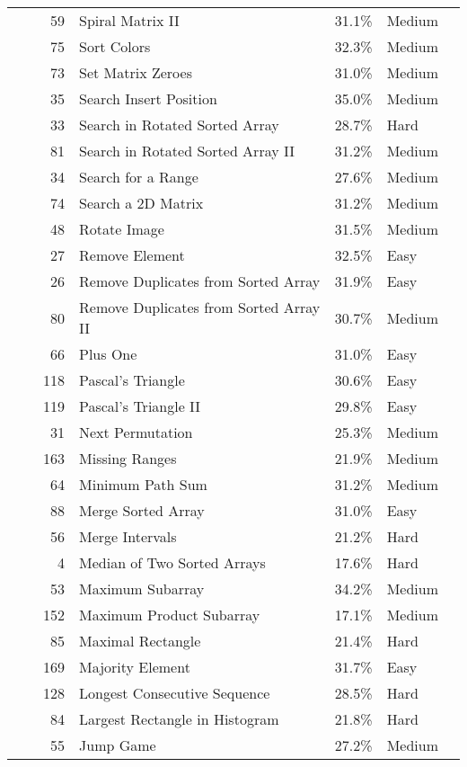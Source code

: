 \documentclass[9pt,b5paper]{article}
\begin{document}
\begin{center}
\begin{tabular}{lrrllll}
 &  & 59 & Spiral Matrix II & 31.1\% & Medium & \\
 &  & 75 & Sort Colors & 32.3\% & Medium & \\
 &  & 73 & Set Matrix Zeroes & 31.0\% & Medium & \\
 &  & 35 & Search Insert Position & 35.0\% & Medium & \\
 &  & 33 & Search in Rotated Sorted Array & 28.7\% & Hard & \\
 &  & 81 & Search in Rotated Sorted Array II & 31.2\% & Medium & \\
 &  & 34 & Search for a Range & 27.6\% & Medium & \\
 &  & 74 & Search a 2D Matrix & 31.2\% & Medium & \\
 &  & 48 & Rotate Image & 31.5\% & Medium & \\
 &  & 27 & Remove Element & 32.5\% & Easy & \\
 &  & 26 & Remove Duplicates from Sorted Array & 31.9\% & Easy & \\
 &  & 80 & Remove Duplicates from Sorted Array II & 30.7\% & Medium & \\
 &  & 66 & Plus One & 31.0\% & Easy & \\
 &  & 118 & Pascal's Triangle & 30.6\% & Easy & \\
 &  & 119 & Pascal's Triangle II & 29.8\% & Easy & \\
 &  & 31 & Next Permutation & 25.3\% & Medium & \\
 &  & 163 & Missing Ranges & 21.9\% & Medium & \\
 &  & 64 & Minimum Path Sum & 31.2\% & Medium & \\
 &  & 88 & Merge Sorted Array & 31.0\% & Easy & \\
 &  & 56 & Merge Intervals & 21.2\% & Hard & \\
 &  & 4 & Median of Two Sorted Arrays & 17.6\% & Hard & \\
 &  & 53 & Maximum Subarray & 34.2\% & Medium & \\
 &  & 152 & Maximum Product Subarray & 17.1\% & Medium & \\
 &  & 85 & Maximal Rectangle & 21.4\% & Hard & \\
 &  & 169 & Majority Element & 31.7\% & Easy & \\
 &  & 128 & Longest Consecutive Sequence & 28.5\% & Hard & \\
 &  & 84 & Largest Rectangle in Histogram & 21.8\% & Hard & \\
 &  & 55 & Jump Game & 27.2\% & Medium & \\

\end{tabular}
\end{center}
\end{document}

